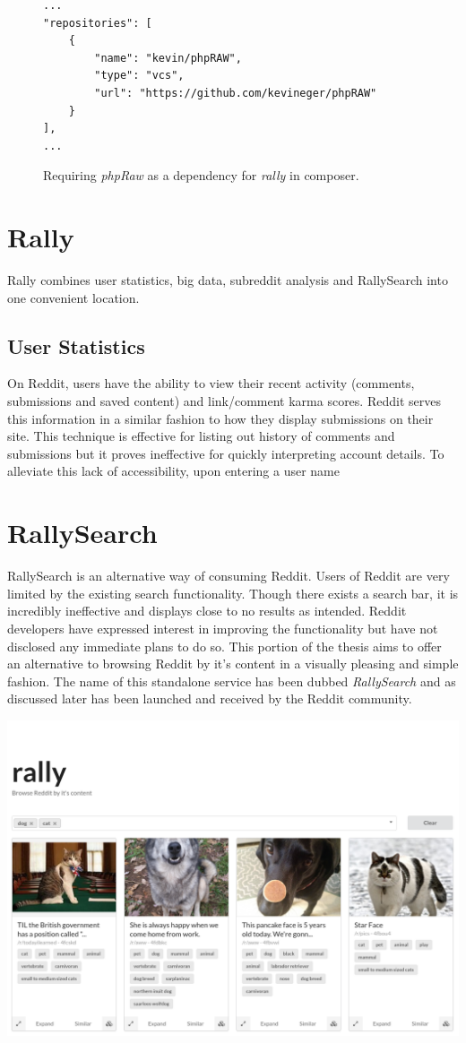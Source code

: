 \documentclass[msc,oneside]{ubcthesis}%
\begin{document}
\begin{figure}[H]
\begin{lstlisting}
...
"repositories": [
	{
		"name": "kevin/phpRAW",
		"type": "vcs",
		"url": "https://github.com/kevineger/phpRAW"
	}
],
...
\end{lstlisting}
\caption[Requiring phpRaw as a dependency in composer.]{
Requiring \textit{phpRaw} as a dependency for \textit{rally} in composer.}
\label{fig:composer}
\end{figure}

\section{Rally}
Rally combines user statistics, big data, subreddit analysis and RallySearch into one convenient location.
\subsection{User Statistics}
On Reddit, users have the ability to view their recent activity (comments, submissions and saved content) and link/comment karma scores. Reddit serves this information in a similar fashion to how they display submissions on their site. This technique is effective for listing out history of comments and submissions but it proves ineffective for quickly interpreting account details. To alleviate this lack of accessibility, upon entering a user name

\section{RallySearch}
RallySearch is an alternative way of consuming Reddit. Users of Reddit are very limited by the existing search functionality. Though there exists a search bar, it is incredibly ineffective and displays close to no results as intended. Reddit developers have expressed interest in improving the functionality but have not disclosed any immediate plans to do so. This portion of the thesis aims to offer an alternative to browsing Reddit by it's content in a visually pleasing and simple fashion. The name of this standalone service has been dubbed \textit{RallySearch} and as discussed later has been launched and received by the Reddit community.

\includegraphics[width=\textwidth]{rallysearch_screenshot.png}
\end{document}
